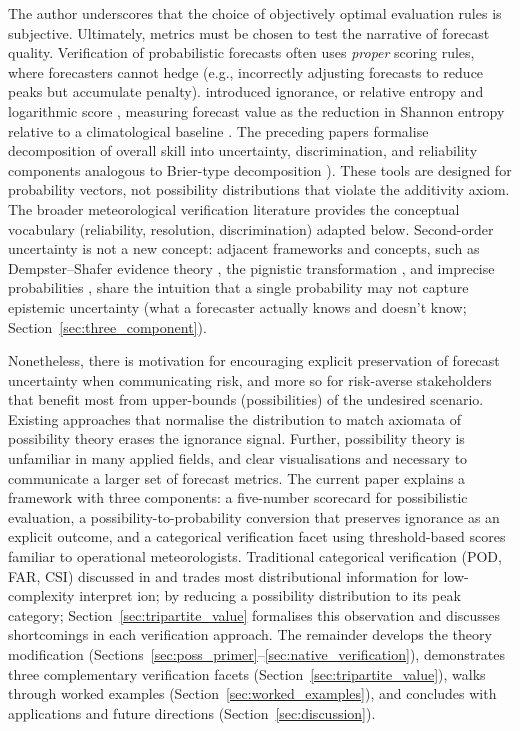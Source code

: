 The author underscores that the choice of objectively
optimal evaluation rules is subjective.
Ultimately, metrics must be chosen to test the
narrative of forecast quality.
Verification of probabilistic forecasts often uses
\textit{proper} scoring rules,
where forecasters cannot hedge
(e.g., incorrectly adjusting forecasts to reduce
peaks but accumulate penalty).
\citet{Roulston2002-eq} introduced ignorance,
or relative entropy \citep{Cover2012-di} and logarithmic score
\citep{Good1952-st}, measuring forecast value as
the reduction in Shannon entropy relative to a
climatological baseline \citep{Peirolo2011-sl}.
The preceding papers formalise decomposition of overall skill into
uncertainty, discrimination, and reliability components
analogous to Brier-type decomposition
\citep[see also][]{Roulston2002-eq,Benedetti2010-sa,Weijs2010-hg, Todter2012-ou}).
These tools are designed for probability vectors,
not possibility distributions that violate the
additivity axiom.
The broader meteorological verification literature
\citep{Murphy1984-ox,Jolliffe2003-xs,Wilks2011-vw}
provides the conceptual vocabulary
(reliability, resolution, discrimination)
adapted below.
Second-order uncertainty is not a new concept:
adjacent frameworks and concepts,
such as Dempster--Shafer evidence theory
\citep{Yager2005-at}, the pignistic transformation
\citep{Smets1990-nf}, and imprecise probabilities
\citep{Walley1982-pm}, share the intuition that a single
probability may not capture epistemic uncertainty
(what a forecaster actually knows and doesn't know;
Section~\ref{sec:three_component}).

Nonetheless, there is motivation for encouraging
explicit preservation of forecast uncertainty when
communicating risk,
and more so for risk-averse stakeholders that benefit
most from upper-bounds (possibilities) of the
undesired scenario.
Existing approaches that normalise the distribution
to match axiomata of possibility theory erases the
ignorance signal.
Further, possibility theory is unfamiliar in many
applied fields,
and clear visualisations and necessary to communicate
a larger set of forecast metrics.
The current paper explains a framework with three
components: a
five-number scorecard for possibilistic evaluation, a
possibility-to-probability conversion that preserves ignorance as an
explicit outcome, and a categorical verification facet using
threshold-based scores familiar to operational meteorologists.
Traditional categorical verification
(POD, FAR, CSI) discussed in \citet{Green1966-xl} and \citet{Jolliffe2003-xs} trades most
distributional information for low-complexity
interpret ion;
by reducing a possibility distribution to its peak
category;
Section~\ref{sec:tripartite_value} formalises this
observation and discusses shortcomings in each
verification approach.
The remainder develops the theory modification
(Sections~\ref{sec:poss_primer}--\ref{sec:native_verification}),
demonstrates three complementary verification facets
(Section~\ref{sec:tripartite_value}), walks through worked examples
(Section~\ref{sec:worked_examples}),
and concludes with applications and future directions
(Section~\ref{sec:discussion}).
